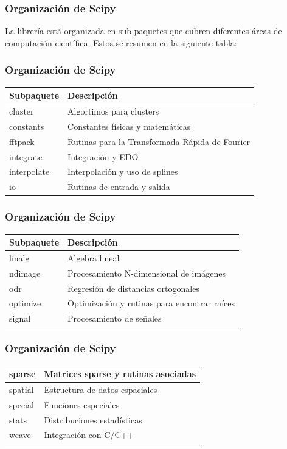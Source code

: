 \documentclass[12pt]{beamer}
\begin{document}
\begin{frame}
\frametitle{Organización de Scipy}
La librería  está organizada en sub-paquetes que cubren diferentes áreas de computación científica. Estos se resumen en la siguiente tabla:
\end{frame}
\begin{frame}
\frametitle{Organización de Scipy}
\fontsize{12}{12}\selectfont
\begin{table}
\renewcommand{\arraystretch}{0.9}
\begin{tabular}{l | l}
	Subpaquete	&	Descripción \\ \hline
	cluster		&	Algortimos para clusters \\ \hline
	constants	&	Constantes físicas y matemáticas \\ \hline
	fftpack 	&	Rutinas para la Transformada Rápida de Fourier \\ \hline
	integrate	&	Integración y EDO \\ \hline
	interpolate	&	Interpolación y uso de splines \\ \hline
	io			&	Rutinas de entrada y salida
\end{tabular}
\end{table}
\end{frame}
\begin{frame}
\frametitle{Organización de Scipy}
\fontsize{12}{12}\selectfont
\begin{table}
\renewcommand{\arraystretch}{0.9}
\begin{tabular}{l | l}
	Subpaquete	&	Descripción \\ \hline
	linalg		&	Algebra lineal \\ \hline
	ndimage		&	Procesamiento N-dimensional de imágenes \\ \hline
	odr			&	Regresión de distancias ortogonales \\ \hline
	optimize	&	Optimización y rutinas para encontrar raíces \\ \hline
	signal		&	Procesamiento de señales \\ \hline
\end{tabular}
\end{table}
\end{frame}
\begin{frame}
\frametitle{Organización de Scipy}
\fontsize{12}{12}\selectfont
\begin{table}
\renewcommand{\arraystretch}{0.9}
\begin{tabular}{l | l}
    sparse		&	Matrices sparse y rutinas asociadas \\ \hline
    spatial		&	Estructura de datos espaciales \\ \hline
    special		&	Funciones especiales \\ \hline
    stats		&	Distribuciones estadísticas \\ \hline
    weave		&	Integración con C/C++
\end{tabular}
\end{table}
\end{frame}
    
\end{document}
